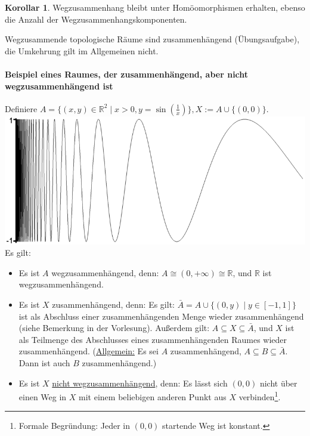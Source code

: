 \documentclass[a4paper,11pt,notitlepage]{report}
\theoremstyle{definition}
\newtheorem{corollary}{Korollar}[chapter]
\newcommand{\R}{{\ensuremath{\mathbb{R}}}}
\begin{document}
\begin{corollary}
	Wegzusammenhang bleibt unter Homöomorphismen erhalten, ebenso die Anzahl der Wegzusammenhangskomponenten.
\end{corollary}

Wegzusammende topologische Räume sind zusammenhängend (Übungsaufgabe), die Umkehrung gilt im Allgemeinen nicht.

\paragraph{Beispiel eines Raumes, der zusammenhängend, aber nicht wegzusammenhängend ist}
Definiere $A = \{(x,y) \in \R^2 \mid x > 0, y = \sin{\left(\frac{1}{x}\right)}\}, X := A \cup \{(0,0)\}$.
\newline
\includegraphics[scale=0.4]{images/Sinuseinsdurchx.png}
\newline
Es gilt:
\begin{itemize}
	\item Es ist $A$ wegzusammenhängend, denn:
	 \newline	
	 $A \cong (0, +\infty) \cong \R$, und $\R$ ist wegzusammenhängend.
	\item Es ist $X$ zusammenhängend, denn:
		\newline
		Es gilt: $\bar{A} = A \cup \{(0,y) \mid y \in [-1,1]\}$ ist als Abschluss einer zusammenhängenden Menge wieder zusammenhängend (siehe Bemerkung in der Vorlesung).
		\newline
		Außerdem gilt: $A \subseteq X \subseteq \bar{A}$, und $X$ ist als Teilmenge des Abschlusses eines zusammenhängenden Raumes wieder zusammenhängend. (\underline{Allgemein:} Es sei $A$ zusammenhängend, $A \subseteq B \subseteq \bar{A}$. Dann ist auch $B$ zusammenhängend.)
	\item Es ist $X$ \underline{nicht wegzusammenhängend}, denn:
		\newline
		Es lässt sich $(0,0)$ nicht über einen Weg in $X$ mit einem beliebigen anderen Punkt aus $X$ verbinden\footnote{Formale Begründung: Jeder in $(0,0)$ startende Weg ist konstant.}.
\end{itemize}
\end{document}
